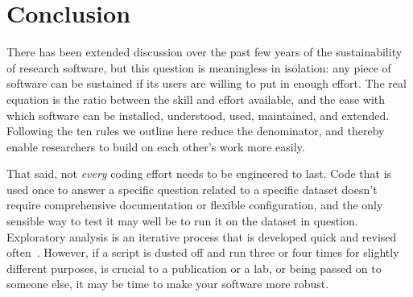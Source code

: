 \documentclass[10pt,letterpaper]{article}
\begin{document}
\section*{Conclusion}

There has been extended discussion over the past few years of the
sustainability of research software, but this question is meaningless
in isolation: any piece of software can be sustained if its users are
willing to put in enough effort.  The real equation is the ratio
between the skill and effort available, and the ease with which
software can be installed, understood, used, maintained, and extended.
Following the ten rules we outline here reduce the denominator, and
thereby enable researchers to build on each other's work more easily.

That said, not \emph{every} coding effort needs to be engineered to
last.  Code that is used once to answer a specific question related to
a specific dataset doesn't require comprehensive documentation or
flexible configuration, and the only sensible way to test it may well
be to run it on the dataset in question. Exploratory analysis is an
iterative process that is developed quick and revised
often~\cite{lawlor2015,sanders2008}.  However, if a script is dusted
off and run three or four times for slightly different purposes, is
crucial to a publication or a lab, or being passed on to someone else,
it may be time to make your software more robust.


\end{document}
